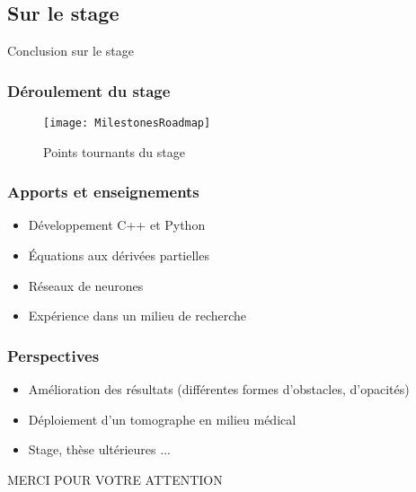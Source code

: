 \subsection{Sur le stage}

\begin{frame}
    \large
    \centering
    Conclusion sur le stage
\end{frame}

\begin{frame}
    \frametitle{Déroulement du stage}
    \begin{figure}
        \texttt{[image: MilestonesRoadmap]}       
        \caption{Points tournants du stage}
    \end{figure}
\end{frame}

\begin{frame}
    \frametitle{Apports et enseignements}
    \begin{itemize}[<+>]
        \item Développement C++ et Python   %
        \item Équations aux dérivées partielles %
        \item Réseaux de neurones %
        \item Expérience dans un milieu de recherche %
    \end{itemize}
\end{frame}

\begin{frame}[<+>]
    \frametitle{Perspectives}
    \begin{itemize}
        \item Amélioration des résultats (différentes formes d'obstacles, d'opacités)
        \item Déploiement d'un tomographe en milieu médical
        \item Stage, thèse ultérieures ...
    \end{itemize}
\end{frame}

\begin{frame}
    \large
    \centering
    MERCI POUR VOTRE ATTENTION
\end{frame}

% 
